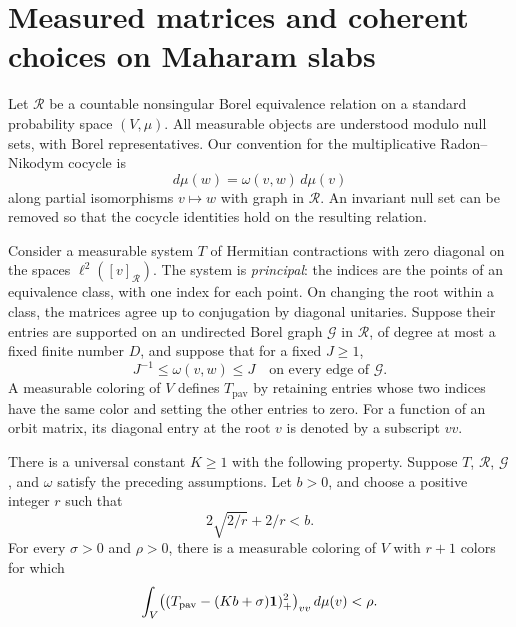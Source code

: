 \section{Measured matrices and coherent choices on Maharam slabs}
\label{sec:slabs}

Let $\mathcal R$ be a countable nonsingular Borel equivalence relation
on a standard probability space $(V,\mu)$. All measurable objects are
understood modulo null sets, with Borel representatives. Our convention
for the multiplicative Radon--Nikodym cocycle is
\begin{equation}
 d\mu(w)=\omega(v,w)\,d\mu(v)
 \label{slab:cocycle}
\end{equation}
along partial isomorphisms $v\mapsto w$ with graph in $\mathcal R$.
An invariant null set can be removed so that the cocycle identities hold
on the resulting relation.

Consider a measurable system $T$ of Hermitian contractions with zero
diagonal on the spaces $\ell^2([v]_{\mathcal R})$. The system is
\emph{principal}: the indices are the points of an equivalence class,
with one index for each point. On changing the root within a class, the
matrices agree up to conjugation by diagonal unitaries. Suppose their
entries are supported on an undirected Borel graph $\mathcal G$ in
$\mathcal R$, of degree at most a fixed finite number $D$, and suppose
that for a fixed $J\geq1$,
\begin{equation}
 J^{-1}\leq\omega(v,w)\leq J
 \quad\text{on every edge of }\mathcal G.
 \label{slab:edge-cocycle}
\end{equation}
A measurable coloring of $V$ defines $T_{\mathrm{pav}}$ by retaining
entries whose two indices have the same color and setting the other
entries to zero. For a function of an orbit matrix, its diagonal entry
at the root $v$ is denoted by a subscript $vv$.

\begin{theorem}
\label{thm:measured-paving}
There is a universal constant $K\geq1$ with the following property.
Suppose $T$, $\mathcal R$, $\mathcal G$, and $\omega$ satisfy the preceding
assumptions. Let $b>0$, and choose a positive integer $r$ such that
\begin{equation}
 2\sqrt{2/r}+2/r<b.
 \label{slab:r-choice}
\end{equation}
For every $\sigma>0$ and $\rho>0$, there is a measurable coloring of $V$
with $r+1$ colors for which
\begin{equation}
 \int_V \bigl((T_{\mathrm{pav}}-(Kb+\sigma)\mathbf 1)_+^2\bigr)_{vv}
 \,d\mu(v)<\rho.
 \label{slab:measured-conclusion}
\end{equation}
\end{theorem}

